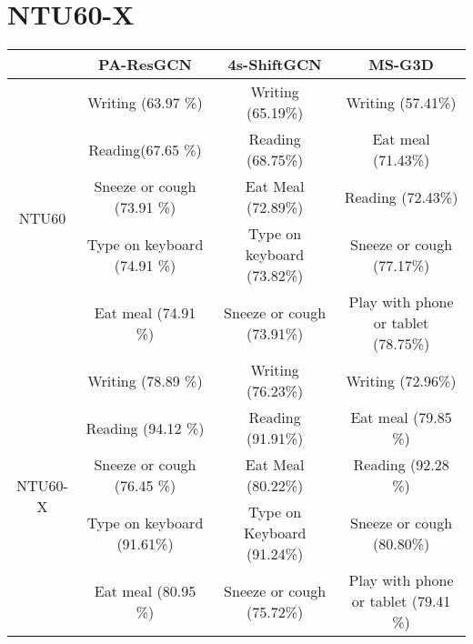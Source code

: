 \documentclass{article}
\begin{document}
\section{NTU60-X}
\label{sec:ntu60x}

\begin{table*}[!t]
\resizebox{\textwidth}{!}
 {\centering 
 \begin{tabular}{c|ccc}
 \toprule
             & \textbf{PA-ResGCN} & \textbf{4s-ShiftGCN} & \textbf{MS-G3D} \\    
 \midrule
    \multirow{5}{4em}{\centering NTU60} & Writing (63.97 \%) & Writing (65.19\%) & Writing (57.41\%)\\
    & Reading(67.65 \%) & Reading (68.75\%) &  Eat meal (71.43\%)\\
    & Sneeze or cough (73.91 \%) & Eat Meal (72.89\%) & Reading (72.43\%)\\
    & Type on keyboard (74.91 \%) & Type on keyboard (73.82\%) & Sneeze or cough (77.17\%)\\
    & Eat meal (74.91 \%) & Sneeze or cough (73.91\%) & Play with phone or tablet (78.75\%)\\
    \midrule
    \multirow{5}{4em}{\centering NTU60-X}  & Writing (78.89 \%) & Writing (76.23\%) & Writing (72.96\%)\\
    & Reading (94.12 \%) & Reading (91.91\%) & Eat meal (79.85 \%)\\
    & Sneeze or cough (76.45 \%)& Eat Meal (80.22\%) & Reading (92.28 \%)\\
    & Type on keyboard (91.61\%) & Type on Keyboard (91.24\%) & Sneeze or cough (80.80\%) \\
    & Eat meal (80.95 \%) & Sneeze or cough (75.72\%) & Play with phone or tablet (79.41 \%)\\
  \bottomrule
 \end{tabular}
  }
\caption{\label{tab:bottom5ntu60} The columns correspond to the state of the art models on the NTU60 dataset. In the first row, the action classes with the lowest accuracy are shown. The second row is similar, except that the results correspond to our newly introduced dataset NTU60-X (Section~\ref{sec:ntu60x}), with models being modified appropriately (Section~\ref{sec:experiments}). Thanks to the availability of additional finger joints on hands in NTU60-X, performances for lowest accuracy classes improve by 10-20\% on average.}
\end{table*}
\end{document}
